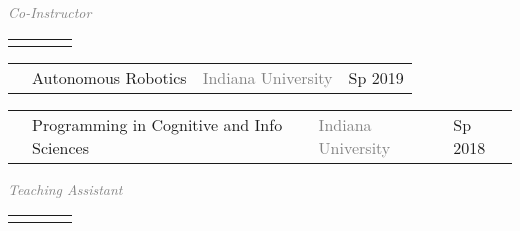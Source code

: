 \documentclass[11pt]{cooperCV_v1/cooperCV} %
\begin{document}
\begin{minipage}{\textwidth}







  
    
        \textcolor{gray}{{\emph{Co-Instructor}}} 
        \begin{tabular}{ p{} %
                        p{}
                        p{} 
                        p{}} %
        \small &   & {\hfill}\textcolor{gray}{\small{}} & {\hfill}\small{}\\ 
        \end{tabular}
      
        \textcolor{gray}{{\emph{}}} 
        \begin{tabular}{ p{} %
                        p{}
                        p{} 
                        p{}} %
        \small &  Autonomous Robotics & {\hfill}\textcolor{gray}{\small{Indiana University}} & {\hfill}\small{Sp 2019}\\ 
        \end{tabular}
      
        \textcolor{gray}{{\emph{}}} 
        \begin{tabular}{ p{} %
                        p{}
                        p{} 
                        p{}} %
        \small &  Programming in Cognitive and Info Sciences & {\hfill}\textcolor{gray}{\small{Indiana University}} & {\hfill}\small{Sp 2018}\\ 
        \end{tabular}
      
  

  
    
        \textcolor{gray}{{\emph{Teaching \newline Assistant}}} 
        \begin{tabular}{ p{} %
                        p{}
                        p{} 
                        p{}} %
        \small &   & {\hfill}\textcolor{gray}{\small{}} & {\hfill}\small{}\\ 
        \end{tabular}
      

\end{minipage}
\end{document}
